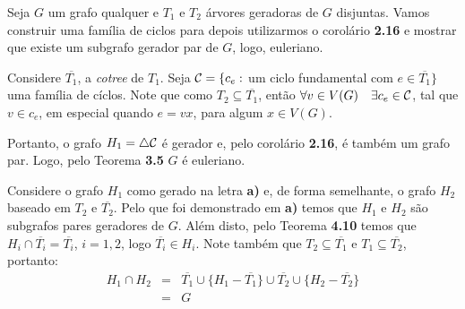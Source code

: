 
 Seja $G$ um grafo qualquer e $T_1$ e $T_2$ árvores geradoras de $G$ disjuntas. Vamos construir uma família de ciclos para depois utilizarmos o corolário {\bf 2.16} e mostrar que existe um subgrafo gerador par de $G$, logo, euleriano.

Considere $\overline{T_1}$, a {\it cotree} de $T_1$.
%
Seja ${\cal C} = \{c_e:$ um ciclo fundamental com $e \in \overline{T_1}\}$ uma família de cíclos.
%
Note que como $T_2 \subseteq \overline{T_1}$, então $\forall v \in V(G)\quad \exists c_e \in {\cal C}$, tal que $v \in c_e$, em especial quando $e = vx$, para algum $x \in V(G)$.

Portanto, o grafo $H_1 = \bigtriangleup {\cal C}$ é gerador e, pelo corolário {\bf 2.16}, é também um grafo par.
%
Logo, pelo Teorema {\bf 3.5} $G$ é euleriano.
\fimprova

 Considere o grafo $H_1$ como gerado na letra {\bf a)} e, de forma semelhante, o grafo $H_2$ baseado em $T_2$ e $\overline{T_2}$.
%
Pelo que foi demonstrado em {\bf a)} temos que $H_1$ e $H_2$ são subgrafos pares geradores de $G$.%
Além disto, pelo Teorema {\bf 4.10} temos que $H_i \cap \overline{T_i} = \overline{T_i}$, $i = 1,2$, logo $\overline{T_i} \in H_i$.
%
Note também que $T_2 \subseteq \overline{T_1}$ e $T_1 \subseteq \overline{T_2}$, portanto: 
\begin{eqnarray}
	H_1 \cap H_2 &=& \overline{T_1} \cup \{H_1 - \overline{T_1}\} \cup \overline{T_2} \cup \{H_2 - \overline{T_2}\} \nonumber \\
		     &=& G \nonumber
\end{eqnarray}
\fimprova
